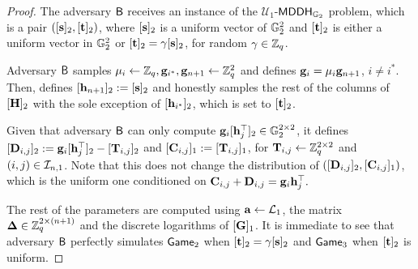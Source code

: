 \begin{proof}
The adversary $\mathsf{B}$ receives an instance of the $\mathcal{U}_1$-$\mathsf{MDDH}_{\mathbb{G}_2}$ problem, which is a pair
$([\mathbf{s}]_2, [\mathbf{t}]_2)$, where $[\mathbf{s}]_2$ is a uniform vector 
of $\mathbb{G}_2^{2}$ and $[\mathbf{t}]_2$ is either a uniform vector in $\mathbb{G}_2^2$ or 
$[\mathbf{t}]_2=\gamma[\mathbf{s}]_2$, for random $\gamma\in\mathbb{Z}_q$.      
 
Adversary $\mathsf{B}$ samples $\mu_i\gets\mathbb{Z}_q,\mathbf{g}_{i^*},\mathbf{g}_{n+1}\gets\mathbb{Z}_q^2$ and defines $\mathbf{g}_i=\mu_i\mathbf{g}_{n+1}$, $i\neq i^*$. Then, defines 
$[\mathbf{h}_{n+1}]_2:= [\mathbf{s}]_2$ and honestly samples the rest of the columns of $[{\mathbf{{H}}}]_2$ with the sole exception of $[\mathbf{h}_{i^*}]_2$, which is set to $[\mathbf{t}]_2$.

Given that adversary $\mathsf{B}$ can only compute $\mathbf{g}_{i}[\mathbf{h}_j^\top]_2\in\mathbb{G}_2^{2\times2}$,
it defines $[\mathbf{{D}}_{i,j}]_2 := \mathbf{g}_{i}[\mathbf{h}_j^\top]_2 - [\mathbf{{T}}_{i,j}]_2$ and
$[\mathbf{{C}}_{i,j}]_1:=[\mathbf{{T}}_{i,j}]_1$, for $\mathbf{{T}}_{i,j}\gets\mathbb{Z}_q^{2\times 2}$ and $(i,j)\in\mathcal{I}_{n,1}$. Note 
that this does not change the distribution of $([\mathbf{{D}}_{i,j}]_2,[\mathbf{{C}}_{i,j}]_1)$, which is the uniform one conditioned
on $\mathbf{{C}}_{i,j}+\mathbf{{D}}_{i,j}= \mathbf{g}_i\mathbf{h}_j^\top.$

The rest of the parameters are computed using $\mathbf{a}\gets\mathcal{L}_1$,
the matrix $\mathbf{{\Delta}} \in \mathbb{Z}_q^{2 \times (n+1)}$ and the discrete logarithms
of $[\mathbf{{G}}]_1$.
It is immediate to see that adversary $\mathsf{B}$ perfectly simulates $\mathsf{Game}_2$ when $[\mathbf{t}]_2=\gamma[\mathbf{s}]_2$ and $\mathsf{Game}_3$ when $[\mathbf{t}]_2$ is uniform.  
\end{proof}

